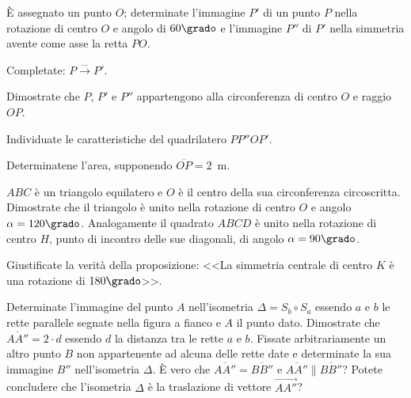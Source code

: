 \noindent\begin{minipage}{0.75\textwidth}\parindent15pt

\begin{esercizio}
\label{ese:8.66} %
\`E assegnato un punto \(O\); determinate l'immagine \(P'\) di un punto 
\(P\) nella rotazione di centro \(O\) e angolo di \(60\grado\) e l'immagine 
\(P''\) di \(P'\) nella simmetria avente come asse la retta \(PO\).
\begin{enumeratea}
\item Completate: \(P \overset{\ldots{}}\longrightarrow P'\). 
\item Dimostrate che \(P\), \(P'\) e \(P''\) appartengono alla 
circonferenza di centro \(O\) e raggio \(OP\).
\item Individuate le caratteristiche del quadrilatero \(PP''OP'\).
\item Determinatene l'area, supponendo \(\overline{OP}=2\)~m.
\end{enumeratea}
\end{esercizio}

\begin{esercizio}
\label{ese:8.67} %
\(ABC\) è un triangolo equilatero e \(O\) è il centro della sua 
circonferenza circoscritta. Dimostrate che il triangolo è unito nella 
rotazione di centro \(O\) e angolo \(\alpha=120\grado\). Analogamente il 
quadrato \(ABCD\) è unito nella rotazione di centro \(H\), punto di 
incontro delle sue diagonali, di angolo \(\alpha=90\grado\).
\end{esercizio}

\begin{esercizio}
\label{ese:8.68} %
Giustificate la verità della proposizione: <<La simmetria centrale di 
centro \(K\) è una rotazione di \(180\grado\)>>.
\end{esercizio}

\begin{esercizio}
\label{ese:8.74} %
Determinate l'immagine del punto \(A\) nell'isometria \(\Delta=S_b \circ 
S_a\) essendo \(a\) e \(b\) le rette parallele segnate nella figura a 
fianco e \(A\) il punto dato. Dimostrate che \(\overline{AA''}=2\cdot d\) 
essendo \(d\) la distanza tra le rette \(a\) e \(b\).
Fissate arbitrariamente un altro punto \(B\) non appartenente ad alcuna 
delle rette date e determinate la sua immagine \(B''\) nell'isometria 
\(\Delta\).
\`E vero che \(\overline{AA''}=\overline{BB''}\) e \(\overline{AA''} 
\parallel \overline{BB''}\)? Potete concludere che l'isometria 
\(\Delta\) è la traslazione di vettore \(\overrightarrow{AA''}\)?
\end{esercizio}
\end{minipage}\hfil
\begin{minipage}{0.3\textwidth}
	\centering~~
\end{minipage}\vspace{8pt}

